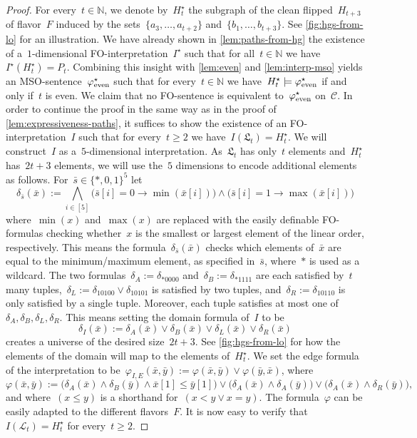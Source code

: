 \documentclass[11pt]{article}      \usepackage[margin=1in]{geometry}  \usepackage{microtype}
\theoremstyle{definition}
\newcommand{\N}[0]{\mathrm{\mathbb{N}}}
\renewcommand{\phi}{\varphi}
\newcommand{\LL}{\mathcal{L}}
\newcommand{\struc}[1]{\mathfrak{#1}}
\newcommand{\CC}{\mathcal{C}}
\renewcommand{\le}{\leqslant}
\renewcommand{\leq}{\le}
\renewcommand{\ge}{\geqslant}
\renewcommand{\geq}{\ge}
\begin{document}
\begin{proof}
    For every~$t \in \N$, we denote by~$H_t^\star$ the subgraph of the
    clean flipped~$H_{t+3}$ of flavor~$F$ induced by the sets~$\{a_3,\ldots,a_{t+2}\}$ and~$\{b_1,\ldots,b_{t + 3}\}$.
    See \cref{fig:hgs-from-lo} for an illustration.
    We have already shown in \cref{lem:paths-from-hg} the existence of a~$1$-dimensional FO-interpretation~$I^\star$ such that for all~$t\in\N$ we have~$I^\star(H^\star_t) = P_t$.
    Combining this insight with \cref{lem:even} and \cref{lem:interp-mso} yields an MSO-sentence~$\even^\star$ such that for every~$t \in \N$ we have~$H^\star_t \models \even^\star$ if and only if~$t$ is even.
    We claim that no FO-sentence is equivalent to~$\even^\star$ on~$\CC$.
    In order to continue the proof in the same way as in the proof of \cref{lem:expressiveness-paths}, it suffices to show the existence of an FO-interpretation~$I$ such that for every~$t \geq 2$ we have~$I(\struc L_t) = H^\star_t$.
    We will construct~$I$ as a~$5$-dimensional interpretation.
    As~$\struc L_t$ has only~$t$ elements and~$H^\star_t$ has~$2t + 3$ elements, we will use the~$5$ dimensions to encode additional elements as follows.
    For~$\bar s \in \{*,0,1\}^5$ let 
    \[
        \delta_{\bar s}(\bar x) := \bigwedge_{i \in [5]} 
        \big (\bar s[i] = 0 \rightarrow \min(\bar x[i])\big )
        \wedge 
        \big(\bar s[i] = 1 \rightarrow \max(\bar x[i])
        \big ) 
    \]
    where~$\min(x)$ and~$\max(x)$ are replaced with the easily definable FO-formulas checking whether~$x$ is the smallest or largest element of the linear order, respectively.
    This means the formula~$\delta_{\bar s}(\bar x)$ checks which elements of~$\bar x$ are equal to the minimum/maximum element, as specified in~$\bar s$, where~$*$ is used as a wildcard.
    The two formulas~$\delta_A := \delta_{*0000}$ and~$\delta_B := \delta_{*1111}$ are each satisfied by~$t$ many tuples,~$\delta_L := \delta_{10100} \vee \delta_{10101}$ is satisfied by two tuples, and~$\delta_R := \delta_{10110}$ is only satisfied by a single tuple.
    Moreover, each tuple satisfies at most one of~$\delta_A,\delta_B,\delta_L,\delta_R$.
    This means setting the domain formula of~$I$ to be
    \[
        \delta_I(\bar x) := \delta_A(\bar x) \vee \delta_B(\bar x) \vee
        \delta_L(\bar x) \vee \delta_R(\bar x)
    \]
    creates a universe of the desired size~$2t+3$.
    See \cref{fig:hgs-from-lo} for how the elements of the domain will map to the elements of~$H^\star_t$.
    We set the edge formula of the interpretation to be~$\phi_{I,E}(\bar x, \bar y) := \phi(\bar x, \bar y) \vee \phi(\bar y, \bar x)$, where
    \[
        \phi(\bar x, \bar y) := 
        \big(
            \delta_A(\bar x) \wedge \delta_B(\bar y) \wedge \bar x[1] \leq \bar y[1]
        \big)
        \vee
        \big(
            \delta_A(\bar x) \wedge \delta_A(\bar y)
        \big)
        \vee
        \big(
            \delta_A(\bar x) \wedge \delta_R(\bar y)
        \big),
    \]
    and where~$(x \leq y)$ is a shorthand for~$(x < y \vee x = y)$.
    The formula~$\phi$ can be easily adapted to the different flavors~$F$.
    It is now easy to verify that~$I(\LL_t) = H^\star_t$ for every~$t\geq 2$.


\end{proof}
\end{document}
